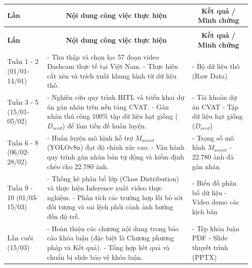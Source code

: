 \documentclass[12pt,a4paper]{report}
\begin{document}
\renewcommand{\arraystretch}{1.5} 
\centering
\begin{longtable}{|>{\centering\arraybackslash}p{2.5cm}|p{6.5cm}|p{5cm}|}
    \hline
    \textbf{Lần} & \multicolumn{1}{c|}{\textbf{Nội dung công việc thực hiện}} & \multicolumn{1}{c|}{\textbf{Kết quả / Minh chứng}} \\
    \hline
    \endfirsthead
    
    \multicolumn{3}{c}{\textit{(Tiếp tục từ trang trước)}} \\
    \hline
    \textbf{Lần} & \multicolumn{1}{c|}{\textbf{Nội dung công việc thực hiện}} & \multicolumn{1}{c|}{\textbf{Kết quả / Minh chứng}} \\
    \hline
    \endhead
    
    \hline
    \endfoot
    \endlastfoot

    Tuần 1 - 2 \newline (01/01-14/01) & 
    - Thu thập và chọn lọc 57 đoạn video Dashcam thực tế tại Việt Nam. \newline
    - Thực hiện cắt xén và trích xuất khung hình từ dữ liệu thô. & 
    - Bộ dữ liệu thô (Raw Data) \\ \hline

    Tuần 3 - 5 \newline (15/01-05/02) & 
    - Nghiên cứu quy trình HITL và triển khai dự án gán nhãn trên nền tảng CVAT. \newline
    - Gán nhãn thủ công 100\% tập dữ liệu hạt giống ($D_{seed}$) để làm tiền đề huấn luyện. & 
    - Tài khoản dự án CVAT \newline
    - Tập dữ liệu hạt giống ($D_{seed}$) \\ \hline

    Tuần 6 - 8 \newline (06/02-28/02) & 
    - Huấn luyện mô hình hỗ trợ $M_{assist}$ (YOLOv8n) đạt độ chính xác cao. \newline
    - Vận hành quy trình gán nhãn bán tự động và kiểm định chéo cho 22.780 ảnh. & 
    - Trọng số mô hình $M_{assist}$ \newline
    - 22.780 ảnh đã gán nhãn \\ \hline

    Tuần 9 - 10 \newline (01/03-15/03) & 
    - Thống kê phân bổ lớp (Class Distribution) và thực hiện Inference xuất video thực nghiệm. \newline
    - Phân tích các trường hợp lỗi bỏ sót đối tượng và sai lệch phối cảnh ảnh hưởng đến độ trễ. & 
    - Biểu đồ phân bổ dữ liệu \newline
    - Video demo các kịch bản \\ \hline

    Lần cuối \newline (15/03) & 
    - Hoàn thiện các chương nội dung trong báo cáo khóa luận (đặc biệt là Chương phương pháp và Kết quả). \newline
    - Tổng hợp kết quả và chuẩn bị slide bảo vệ khóa luận. & 
    - Tệp khóa luận PDF \newline
    - Slide thuyết trình (PPTX) \\ \hline
\end{longtable}
\end{document}
